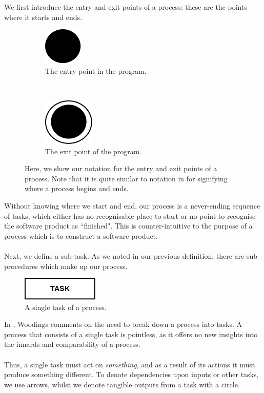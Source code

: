We first introduce the entry and exit points of a process; these are the points where it starts and
ends.

\begin{figure}[h!]
\centering
\begin{subfigure}[b]{.45\textwidth}
\centering
\includegraphics[scale=0.6]{media/Entry}
\caption{The entry point in the program.}
\label{entryFigure}
\end{subfigure}
~
\begin{subfigure}[b]{.45\textwidth}
\centering
\includegraphics[scale=0.6]{media/Exit}
\caption{The exit point of the program.}
\label{exitFigure}
\end{subfigure}
\caption{Here, we show our notation for the entry and exit points of a process.
Note that it is quite similar to notation in \cite{Dumas01umlactivity} for
  signifying where a process begins and ends.}
\label{entryExitFigure}
\end{figure}

Without knowing where we start and end, our process is a never-ending sequence of tasks, which
either has no recognisable place to start or no point to recognise the software product as
``finished".
This is counter-intuitive to the purpose of a process which is to construct a software product.\\
\\
Next, we define a sub-task.
As we noted in our previous definition, there are sub-procedures which make up our process.

\begin{figure}[h!]
\centering
\includegraphics[scale=0.6]{media/Task}
\caption{A single task of a process.}
\label{taskFigure}
\end{figure}

In \cite{Woodings2013Tut1}, Woodings comments on the need to break down a
process into tasks.
A process that consists of a single task is pointless, as it offers no new
insights into the innards and comparability of a process.\\
\\
Thus, a single task must act on {\em something}, and as a result of its actions
it must produce something different.
To denote dependencies upon inputs or other tasks, we use arrows, whilst we denote tangible outputs
from a task with a circle.


